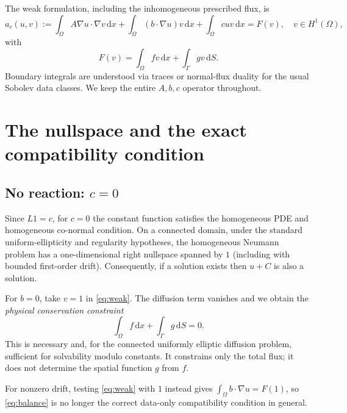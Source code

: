 \documentclass[11pt,letterpaper]{article}
\newcommand{\Om}{\Omega}
\newcommand{\Gm}{\Gamma}
\newcommand{\dd}{\,\mathrm d}
\newcommand{\HH}{H^1(\Om)}
\begin{document}
The weak formulation, including the inhomogeneous prescribed flux, is
\begin{equation}\label{eq:weak}
 a_c(u,v):=\int_\Om A\nabla u\cdot\nabla v\dd x
 +\int_\Om(b\cdot\nabla u)v\dd x
 +\int_\Om cuv\dd x
 =F(v),\quad v\in\HH,
\end{equation}
with
\begin{equation}\label{eq:F}
 F(v)=\int_\Om fv\dd x+\int_\Gm gv\dd S.
\end{equation}
Boundary integrals are understood via traces or normal-flux duality for the
usual Sobolev data classes. We keep the entire $A,b,c$ operator throughout.

\section{The nullspace and the exact compatibility condition}
\subsection{No reaction: $c=0$}
Since $L1=c$, for $c=0$ the constant function satisfies the homogeneous PDE
and homogeneous co-normal condition. On a connected domain, under the standard
uniform-ellipticity and regularity hypotheses, the homogeneous Neumann
problem has a one-dimensional right nullspace spanned by $1$ (including with
bounded first-order drift). Consequently, if a solution exists then $u+C$ is
also a solution.

For $b=0$, take $v=1$ in \eqref{eq:weak}. The diffusion term vanishes and we
obtain the \emph{physical conservation constraint}
\begin{equation}\label{eq:balance}
 \boxed{\int_\Om f\dd x+\int_\Gm g\dd S=0.}
\end{equation}
This is necessary and, for the connected uniformly elliptic diffusion problem,
sufficient for solvability modulo constants. It constrains only the total flux;
it does not determine the spatial function $g$ from $f$.

For nonzero drift, testing \eqref{eq:weak} with $1$ instead gives
$\int_\Om b\cdot\nabla u=F(1)$, so \eqref{eq:balance} is no longer the
correct data-only compatibility condition in general.
\end{document}
